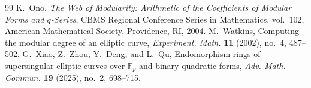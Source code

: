 \documentclass[10pt,a4paper]{amsart}
\newcommand{\F}{\mathbb{F}}
\begin{document}
\begin{thebibliography}{99}
 K.~Ono, \emph{The Web of Modularity: Arithmetic of the Coefficients of Modular Forms and $q$-Series}, CBMS Regional Conference Series in Mathematics, vol.~102, American Mathematical Society, Providence, RI, 2004.
 M.~Watkins, Computing the modular degree of an elliptic curve, \emph{Experiment. Math.} \textbf{11} (2002), no.~4, 487--502.
 G.~Xiao, Z.~Zhou, Y.~Deng, and L.~Qu, Endomorphism rings of supersingular elliptic curves over $\F_p$ and binary quadratic forms, \emph{Adv. Math. Commun.} \textbf{19} (2025), no.~2, 698--715.
\end{thebibliography}
\end{document}

